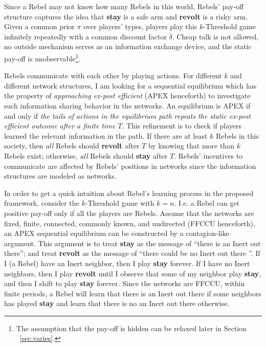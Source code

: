 \documentclass[12pt,letter]{article}
\theoremstyle{definition}
\theoremstyle{remark}
\theoremstyle{claim}
\begin{document}
Since a Rebel may not know how many Rebels in this world, Rebels' pay-off structure captures the idea that \textbf{stay} is a safe arm and \textbf{revolt} is a risky arm. Given a common prior $\pi$ over players' types, players play this $k$-Threshold game infinitely repeatedly with a common discount factor $\delta$. Cheap talk is not allowed, no outside mechanism serves as an information exchange device, and the static pay-off is unobservable\footnote{The assumption that the pay-off is hidden can be relaxed later in Section ~\ref{sec:varies}.}.

Rebels communicate with each other by playing actions. For different $k$ and different network structures, I am looking for a sequential equilibrium which has the property of \textit{approaching ex-post efficient} (APEX henceforth) to investigate such information sharing behavior in the networks. An equilibrium is APEX if and only if \textit{the tails of actions in the equilibrium path repeats the static ex-post efficient outcome after a finite time $T$}.  This refinement is to check if players learned the relevant information in the path. If there are at least $k$ Rebels in this society, then \textit{all} Rebels should \textbf{revolt} after $T$ by knowing that more than $k$ Rebels exist; otherwise, \textit{all} Rebels should \textbf{stay} after $T$. Rebels' incentives to communicate are affected by Rebels' positions in networks since the information structures are modeled as networks.

In order to get a quick intuition about Rebel's learning process in the proposed framework, consider the $k$-Threshold game with $k=n$. I.e. a Rebel can get positive pay-off only if all the players are Rebels. Assume that the networks are fixed, finite, connected, commonly known, and undirected (FFCCU henceforth), an APEX sequential equilibrium can be constructed by a contagion-like argument. This argument is to treat \textbf{stay} as the message of ``there is an Inert out there''; and treat \textbf{revolt} as the message of ``there could be no Inert out there ''. If I (a Rebel) have an Inert neighbor, then I play \textbf{stay} forever. If I have no Inert neighbors, then I play \textbf{revolt} until I observe that some of my neighbor play \textbf{stay}, and then I shift to play \textbf{stay} forever. Since the networks are FFCCU,  within finite periods, a Rebel will learn that there is an Inert out there if some neighbors has played \textbf{stay} and learn that there is no an Inert out there otherwise.
\end{document}
